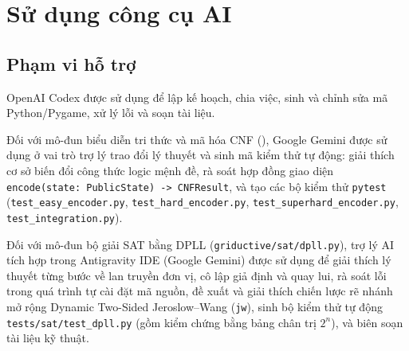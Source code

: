 \chapter{Sử dụng công cụ AI}
\label{app:ai}

\section{Phạm vi hỗ trợ}
OpenAI Codex được sử dụng để lập kế hoạch, chia việc, sinh và chỉnh sửa mã Python/Pygame, xử lý lỗi và soạn tài liệu.

Đối với mô-đun biểu diễn tri thức và mã hóa CNF (), Google Gemini được sử dụng ở vai trò trợ lý trao đổi lý thuyết và sinh mã kiểm thử tự động: giải thích cơ sở biến đổi công thức logic mệnh đề, rà soát hợp đồng giao diện \texttt{encode(state: PublicState) -> CNFResult}, và tạo các bộ kiểm thử \texttt{pytest} (\texttt{test\_easy\_encoder.py}, \texttt{test\_hard\_encoder.py}, \texttt{test\_superhard\_encoder.py}, \texttt{test\_integration.py}).

Đối với mô-đun bộ giải SAT bằng DPLL (\texttt{griductive/sat/dpll.py}), trợ lý AI tích hợp trong Antigravity IDE (Google Gemini) được sử dụng để giải thích lý thuyết từng bước về lan truyền đơn vị, cô lập giả định và quay lui, rà soát lỗi trong quá trình tự cài đặt mã nguồn, đề xuất và giải thích chiến lược rẽ nhánh mở rộng Dynamic Two-Sided Jeroslow--Wang (\texttt{jw}), sinh bộ kiểm thử tự động \texttt{tests/sat/test\_dpll.py} (gồm kiểm chứng bằng bảng chân trị $2^n$), và biên soạn tài liệu kỹ thuật.

